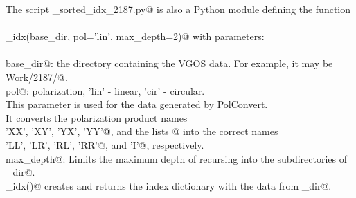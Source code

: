 \documentclass[letterpaper,twoside,12pt]{article}
\begin{document}
\noindent The script \verb@make_sorted_idx_2187.py@ is also a Python module defining the function \\ \\
\verb@make_idx(base_dir, pol='lin', max_depth=2)@ with parameters: \\ \\
\verb@    base_dir@: the directory containing the VGOS data. For example, it may be \\
\verb@              Work/2187/@. \\
\verb@    pol@: polarization, 'lin' - linear, 'cir' - circular. \\
    \indent \indent \indent This parameter is used for the data generated by PolConvert. \\
    \indent \indent \indent It converts the polarization product names\\
    \verb@          'XX', 'XY', 'YX', 'YY'@, and the lists \verb@['XX', 'YY']@ into the correct names \\
    \verb@          'LL', 'LR', 'RL', 'RR'@, and \verb@'I'@, respectively. \\
\verb@    max_depth@: Limits the maximum depth of recursing into the subdirectories of \verb@base_dir@. \\

\noindent \verb@make_idx()@ creates and returns the index dictionary with the data from \verb@base_dir@. \\
\end{document}
